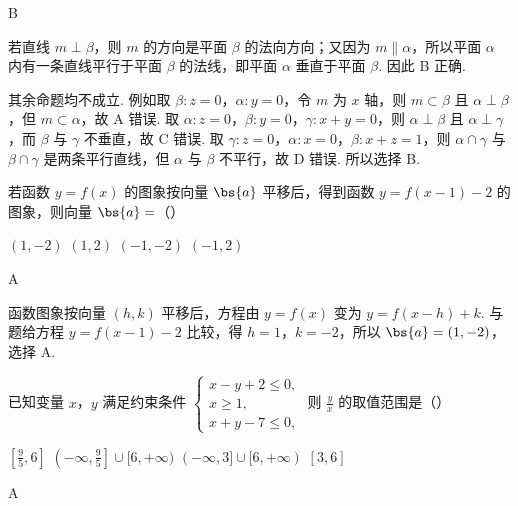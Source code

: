 \begin{answer}
B
\end{answer}

\begin{solution}
若直线 \(m\perp\beta\)，则 \(m\) 的方向是平面 \(\beta\) 的法向方向；又因为 \(m\parallel\alpha\)，所以平面 \(\alpha\) 内有一条直线平行于平面 \(\beta\) 的法线，即平面 \(\alpha\) 垂直于平面 \(\beta\). 因此 B 正确.

其余命题均不成立. 例如取 \(\beta:z=0\)，\(\alpha:y=0\)，令 \(m\) 为 \(x\) 轴，则 \(m\subset\beta\) 且 \(\alpha\perp\beta\)，但 \(m\subset\alpha\)，故 A 错误. 取 \(\alpha:z=0\)，\(\beta:y=0\)，\(\gamma:x+y=0\)，则 \(\alpha\perp\beta\) 且 \(\alpha\perp\gamma\)，而 \(\beta\) 与 \(\gamma\) 不垂直，故 C 错误. 取 \(\gamma:z=0\)，\(\alpha:x=0\)，\(\beta:x+z=1\)，则 \(\alpha\cap\gamma\) 与 \(\beta\cap\gamma\) 是两条平行直线，但 \(\alpha\) 与 \(\beta\) 不平行，故 D 错误. 所以选择 B.
\end{solution}

\begin{problem}
若函数 \(y=f(x)\) 的图象按向量 \(\bs{a}\) 平移后，得到函数 \(y=f(x-1)-2\) 的图象，则向量 \(\bs{a}=\)（\quad）

\choices
    {\((1,-2)\)}
    {\((1,2)\)}
    {\((-1,-2)\)}
    {\((-1,2)\)}
\end{problem}

\begin{answer}
A
\end{answer}

\begin{solution}
函数图象按向量 \((h,k)\) 平移后，方程由 \(y=f(x)\) 变为 \(y=f(x-h)+k\). 与题给方程
\(y=f(x-1)-2\) 比较，得 \(h=1\)，\(k=-2\)，所以 \(\bs{a}=(1,-2)\)，选择 A.
\end{solution}

\begin{problem}
已知变量 \(x\)，\(y\) 满足约束条件 \(\begin{cases}
x-y+2\leqslant0,\\
x\geqslant1,\\
x+y-7\leqslant0,
\end{cases}\) 则 \(\frac{y}{x}\) 的取值范围是（\quad）

\choices
    {\(\left[\frac{9}{5},6\right]\)}
    {\(\left(-\infty,\frac{9}{5}\right]\cup[6,+\infty)\)}
    {\((-\infty,3]\cup[6,+\infty)\)}
    {\([3,6]\)}
\end{problem}

\begin{answer}
A
\end{answer}

